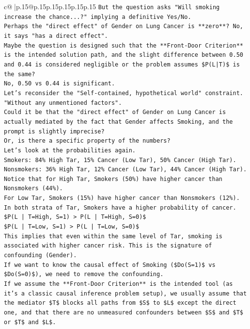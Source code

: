 \documentclass{article}
\begin{document}
{\begin{supertabular}{c@{$\;$}|p{.15\linewidth}@{}p{.15\linewidth}p{.15\linewidth}p{.15\linewidth}p{.15\linewidth}p{.15\linewidth}}
{{{\texttt{But the question asks "Will smoking increase the chance...?" implying a definitive Yes/No.} \\
\texttt{Perhaps the "direct effect" of Gender on Lung Cancer is **zero**? No, it says "has a direct effect".} \\
\texttt{Maybe the question is designed such that the **Front{-}Door Criterion** is the intended solution path, and the slight difference between 0.50 and 0.44 is considered negligible or the problem assumes \$P(L|T)\$ is the same?} \\
\texttt{No, 0.50 vs 0.44 is significant.} \\
\texttt{Let's reconsider the "Self{-}contained, hypothetical world" constraint. "Without any unmentioned factors".} \\
\texttt{Could it be that the "direct effect" of Gender on Lung Cancer is actually mediated by the fact that Gender affects Smoking, and the prompt is slightly imprecise?} \\
\texttt{Or, is there a specific property of the numbers?} \\
\texttt{Let's look at the probabilities again.} \\
\texttt{Smokers: 84\% High Tar, 15\% Cancer (Low Tar), 50\% Cancer (High Tar).} \\
\texttt{Nonsmokers: 36\% High Tar, 12\% Cancer (Low Tar), 44\% Cancer (High Tar).} \\
\texttt{Notice that for High Tar, Smokers (50\%) have higher cancer than Nonsmokers (44\%).} \\
\texttt{For Low Tar, Smokers (15\%) have higher cancer than Nonsmokers (12\%).} \\
\texttt{In both strata of Tar, Smokers have a higher probability of cancer.} \\
\texttt{\$P(L | T=High, S=1) > P(L | T=High, S=0)\$} \\
\texttt{\$P(L | T=Low, S=1) > P(L | T=Low, S=0)\$} \\
\texttt{This implies that even within the same level of Tar, smoking is associated with higher cancer risk. This is the signature of confounding (Gender).} \\
\texttt{If we want to know the causal effect of Smoking (\$Do(S=1)\$ vs \$Do(S=0)\$), we need to remove the confounding.} \\
\texttt{If we assume the **Front{-}Door Criterion** is the intended tool (as it's a classic causal inference problem setup), we usually assume that the mediator \$T\$ blocks all paths from \$S\$ to \$L\$ except the direct one, and that there are no unmeasured confounders between \$S\$ and \$T\$ or \$T\$ and \$L\$.} \\
}}}
\end{supertabular}}
\end{document}
